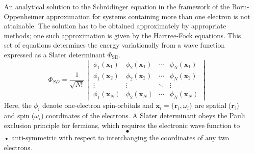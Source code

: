 An analytical solution to the Schr\"odinger equation in the framework of
the Born-Oppenheimer approximation for systems containing more than one
electron is not attainable. The solution has to be obtained approximately by appropriate
methods; one such approximation is given by the Hartree-Fock equations. This set of
equations determines the energy variationally from a wave function expressed as a Slater
determinant
$\Phi_\text{SD}$.\autocite{Slater_TheoryComplexSpectra_1929,Fock_NaeherungsmethodezurLoesung_1930}
%
\begin{equation}
     \Phi_{SD}=\frac{1}{\sqrt{N!}}
     \begin{vmatrix}
         \phi_1(\mathbf{x}_1) & \phi_2(\mathbf{x}_1) & \cdots & \phi_N(\mathbf{x}_1)\\
         \phi_1(\mathbf{x}_2) & \phi_2 (\mathbf{x}_2) & \cdots & \phi_N(\mathbf{x}_2)\\
         \vdots & \vdots & \ddots & \vdots\\
         \phi_1(\mathbf{x}_N) & \phi_2(\mathbf{x}_N) & \cdots & \phi_N(\mathbf{x}_N)
     \end{vmatrix}
     \label{eqn:SlaterDet}
\end{equation}
%
Here, the $\phi_i$ denote one-electron spin-orbitals and
$\mathbf{x}_i=\{\mathbf{r}_i,\omega_i\}$ are spatial ($\mathbf{r}_i$) and spin
($\omega_i$) coordinates of the electrons. A Slater determinant obeys the Pauli
exclusion principle for fermions, which requires the electronic wave function to \begin{equation}
•
\end{equation}•
anti-symmetric with respect to interchanging the coordinates of any two electrons.

